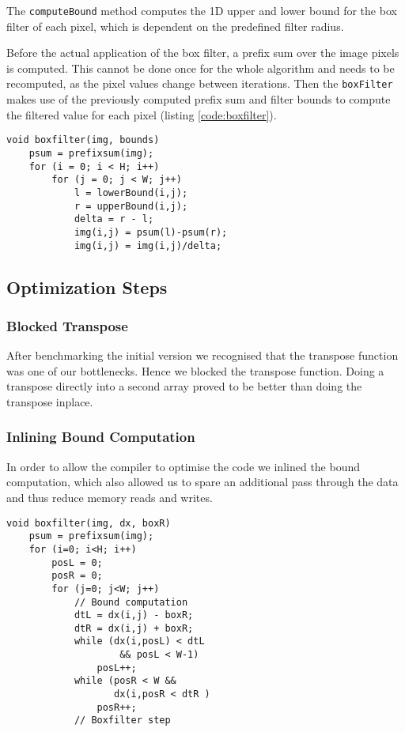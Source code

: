The \lstinline{computeBound} method computes the 1D upper and lower bound for the box filter of each pixel, which is dependent on the predefined filter radius. 

Before the actual application of the box filter, a prefix sum over the image pixels is computed. This cannot be done once for the whole algorithm and needs to be recomputed, as the pixel values change between iterations. Then the \lstinline{boxFilter} makes use of the previously computed prefix sum and filter bounds to compute the filtered value for each pixel (listing \ref{code:boxfilter}).

\begin{lstlisting}[caption=Boxfilter step, label=code:boxfilter]
void boxfilter(img, bounds) 
    psum = prefixsum(img);
    for (i = 0; i < H; i++) 
        for (j = 0; j < W; j++)
            l = lowerBound(i,j);
            r = upperBound(i,j);
            delta = r - l;
            img(i,j) = psum(l)-psum(r);
            img(i,j) = img(i,j)/delta;
\end{lstlisting}

\subsection{Optimization Steps}

\subsubsection{Blocked Transpose}

After benchmarking the initial version we recognised that the transpose function was one of our bottlenecks. Hence we blocked the transpose function. Doing a transpose directly into a second array proved to be better than doing the transpose inplace.

\subsubsection{Inlining Bound Computation}

In order to allow the compiler to optimise the code we inlined the bound computation, which also allowed us to spare an additional pass through the data and thus reduce memory reads and writes.

\begin{lstlisting}[caption=Inlining of the bound computation, label=code:inlining]
void boxfilter(img, dx, boxR) 
    psum = prefixsum(img);
    for (i=0; i<H; i++)
        posL = 0;
        posR = 0;
        for (j=0; j<W; j++)
            // Bound computation
            dtL = dx(i,j) - boxR;
            dtR = dx(i,j) + boxR;
            while (dx(i,posL) < dtL 
                    && posL < W-1)
                posL++;
            while (posR < W && 
                   dx(i,posR < dtR )
                posR++;
            // Boxfilter step
\end{lstlisting}

